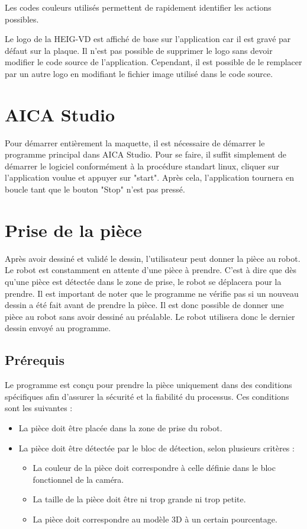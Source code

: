 Les codes couleurs utilisés permettent de rapidement identifier les actions possibles.

Le logo de la HEIG-VD est affiché de base sur l'application car il est gravé par défaut sur la plaque. Il n'est pas possible de supprimer le logo sans devoir modifier le code source de l'application. Cependant, il est possible de le remplacer par un autre logo en modifiant le fichier image utilisé dans le code source.


\section{AICA Studio}
Pour démarrer entièrement la maquette, il est nécessaire de démarrer le programme principal dans AICA Studio. Pour se faire, il suffit simplement de démarrer le logiciel conformément à la procédure standart linux, cliquer sur l'application voulue et appuyer sur "start". Après cela, l'application tournera en boucle tant que le bouton "Stop" n'est pas pressé.

\section{Prise de la pièce}

Après avoir dessiné et validé le dessin, l'utilisateur peut donner la pièce au robot. Le robot est constamment en attente d'une pièce à prendre. C'est à dire que dès qu'une pièce est détectée dans le zone de prise, le robot se déplacera pour la prendre. Il est important de noter que le programme ne vérifie pas si un nouveau dessin a été fait avant de prendre la pièce. Il est donc possible de donner une pièce au robot sans avoir dessiné au préalable. Le robot utilisera donc le dernier dessin envoyé au programme.

\subsection{Prérequis}

Le programme est conçu pour prendre la pièce uniquement dans des conditions spécifiques afin d'assurer la sécurité et la fiabilité du processus. Ces conditions sont les suivantes :
\begin{itemize}
    \item La pièce doit être placée dans la zone de prise du robot.
    \item La pièce doit être détectée par le bloc de détection, selon plusieurs critères :
          \begin{itemize}
              \item La couleur de la pièce doit correspondre à celle définie dans le bloc fonctionnel de la caméra.
              \item La taille de la pièce doit être ni trop grande ni trop petite.
              \item La pièce doit correspondre au modèle 3D à un certain pourcentage.
          \end{itemize}
\end{itemize}

